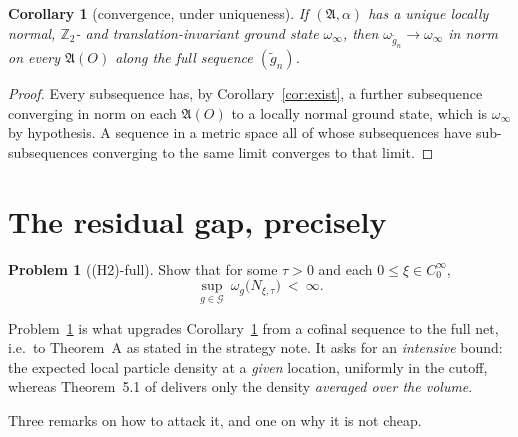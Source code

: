 \documentclass[11pt,a4paper]{article}
\theoremstyle{plain}
\newtheorem{corollary}[theorem]{Corollary}
\theoremstyle{definition}
\newtheorem{problem}[theorem]{Problem}
\newcommand{\A}{\mathfrak{A}}
\newcommand{\G}{\mathcal{G}}
\begin{document}
\begin{corollary}[convergence, under uniqueness]\label{cor:conv}
If $(\A,\alpha)$ has a unique locally normal, $\mathbb Z_2$- and translation-invariant ground
state $\omega_\infty$, then $\omega_{\tilde g_n}\to\omega_\infty$ in norm on every $\A(O)$ along the
full sequence $(\tilde g_n)$.
\end{corollary}

\begin{proof}
Every subsequence has, by Corollary~\ref{cor:exist}, a further subsequence converging in norm on
each $\A(O)$ to a locally normal ground state, which is $\omega_\infty$ by hypothesis. A sequence
in a metric space all of whose subsequences have sub-subsequences converging to the same limit
converges to that limit.
\end{proof}

\section{The residual gap, precisely}\label{sec:gap}

\begin{problem}[(H2)-full]\label{prob:full}
Show that for some $\tau>0$ and each $0\le\xi\in C_0^\infty$,
\[
  \sup_{g\in\G}\ \omega_g\bigl(N_{\xi,\tau}\bigr)\ <\ \infty .
\]
\end{problem}

Problem~\ref{prob:full} is what upgrades Corollary~\ref{cor:conv} from a cofinal sequence to the
full net, i.e.\ to Theorem~A as stated in the strategy note. It asks for an \emph{intensive}
bound: the expected local particle density at a \emph{given} location, uniformly in the cutoff,
whereas Theorem~5.1 of \cite{GJIII} delivers only the density \emph{averaged over the volume}.

Three remarks on how to attack it, and one on why it is not cheap.
\end{document}
